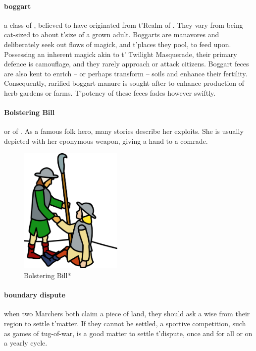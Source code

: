 \paragraph{boggart} a class of , believed to have originated from t'\allowbreak Realm of . They vary from being cat-sized to about t'\allowbreak size of a grown adult. Boggarts are manavores and deliberately seek out flows of magick, and t'\allowbreak places they pool, to feed upon. Possessing an inherent magick akin to t'\allowbreak {} Twilight Masquerade, their primary defence is camouflage, and they rarely approach or attack citizens. Boggart feces are also kent to enrich – or perhaps transform – soils and enhance their fertility. Consequently, rarified boggart manure is sought after to enhance production of herb gardens or farms. T'potency of these feces fades however swiftly. 
\paragraph{Bolstering Bill} or   of . As a famous folk hero, many stories describe her exploits. She is usually depicted with her eponymous weapon, giving a hand to a comrade.\begin{figure} \centering \includegraphics[width=5cm]{encyclopedia/Wilhelmina} \caption{Bolstering Bill*}\end{figure}
\paragraph{boundary dispute} when two Marchers both claim a piece of land, they should ask a wise  from their region to settle t'\allowbreak matter. If they cannot be settled, a sportive competition, such as games of tug-of-war, is a good matter to settle t'\allowbreak dispute, once and for all or on a yearly cycle.
